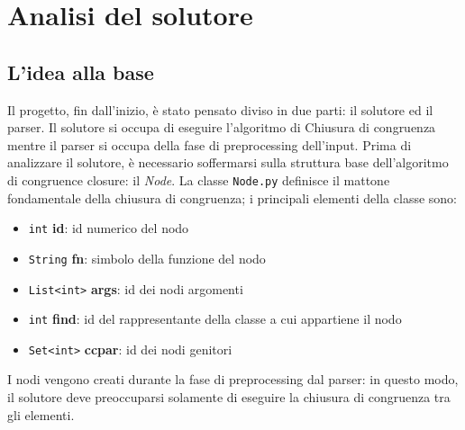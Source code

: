 \chapter{Analisi del solutore}
\section{L'idea alla base}
Il progetto, fin dall'inizio, è stato pensato diviso in due parti: il solutore ed il parser. Il solutore si occupa di
eseguire l'algoritmo di Chiusura di congruenza mentre il parser si occupa della fase di preprocessing dell'input.
Prima di analizzare il solutore, è necessario soffermarsi sulla struttura base dell'algoritmo
di congruence closure: il \textit{Node}. La classe \texttt{Node.py} definisce il mattone fondamentale
della chiusura di congruenza; i principali elementi della classe sono:
\begin{itemize}
    \item \texttt{int} \textbf{id}: id numerico del nodo
    \item \texttt{String} \textbf{fn}: simbolo della funzione del nodo
    \item \texttt{List<int>} \textbf{args}: id dei nodi argomenti
    \item \texttt{int} \textbf{find}: id del rappresentante della classe a cui appartiene il nodo
    \item \texttt{Set<int>} \textbf{ccpar}: id dei nodi genitori
\end{itemize}
I nodi vengono creati durante la fase di preprocessing dal parser: in questo modo, il solutore
deve preoccuparsi solamente di eseguire la chiusura di congruenza tra gli elementi.

